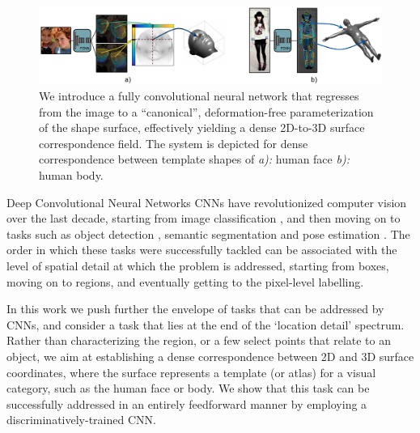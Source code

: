 


\begin{figure}[h!]
\begin{center}
   \includegraphics[width=1\linewidth]{Figures/denseregPami2}
\end{center}
   \caption{ We introduce a fully convolutional neural network that regresses from the image to a ``canonical'', deformation-free parameterization of the shape surface, effectively yielding a dense 2D-to-3D surface correspondence field. The system is depicted for dense correspondence between template shapes of \textit{a):} human face \textit{b):} human body.}
\label{fig:intro}
\end{figure}


Deep Convolutional Neural Networks CNNs \citep{lecun1998gradient}
have revolutionized computer vision over the last decade, starting from  image classification \citep{krizhevsky2012imagenet, simonyan2014very, szegedy2015going,he2016deep}, and then moving on to tasks such as object detection \citep{girshick2014rich}, semantic segmentation \citep{long2015fully,chen2016deeplab} and pose estimation \citep{chen2014articulated, tompson2014joint,yang2016end,newell2016stacked}.
The order in which these tasks were successfully tackled can  be associated with the level of spatial detail at which the problem is addressed, starting from boxes, moving on to regions, and eventually getting to the  pixel-level labelling.

In this work we push further the envelope of tasks that can be addressed by CNNs, and consider a task that lies at the end of the `location detail' spectrum.
 Rather than characterizing  the region, or a few select points  that relate to an object, we aim at establishing a dense correspondence between 2D  and 3D surface coordinates, where the surface represents a template (or atlas) for a visual category, such as the human face or body. 
We show that  this task can be successfully addressed in an entirely feedforward manner by employing a discriminatively-trained CNN. 

